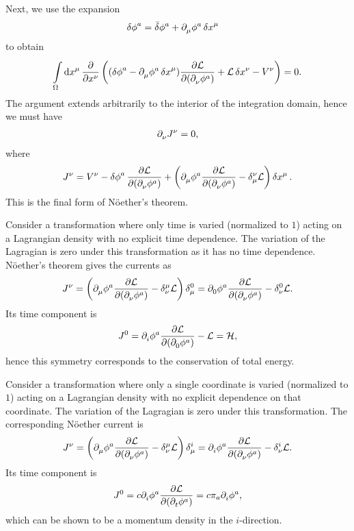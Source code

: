 Next, we use the expansion
\begin{align*}
	\var{\phi}^{a}  &= \bar{\delta}\phi^{a} + \partial^{}_{\mu}{\phi^{a}}\var{x}^{\mu}
\end{align*}
to obtain
\begin{align*}
	\int\limits_{\Omega}^{}\dd{x^{\mu}}{\pdv{x^{\nu}}\left((\var{\phi}^{a} - \ensuremath{\partial^{}_{\mu}}{\phi^{a}}\var{x}^{\mu})\pdv{\ensuremath{\mathcal{L}}}{(\ensuremath{\partial^{}_{\nu}}{\phi^{a}})} + \ensuremath{\mathcal{L}}\var{x^{\nu}} - V^{\nu}\right)} = 0.
\end{align*}
The argument extends arbitrarily to the interior of the integration domain, hence we must have
\begin{align*}
	\partial^{}_{\nu}{J^{\nu}} = 0,
\end{align*}
where
\begin{align*}
	J^{\nu} = V^{\nu} - \var{\phi}^{a}\pdv{\lag}{(\del{}{\nu}{\phi^{a}})} + \left(\del{}{\mu}{\phi^{a}}\pdv{\lag}{(\del{}{\nu}{\phi^{a}})} - \kdelta{\nu}{\mu}\lag\right)\var{x^{\mu}}.
\end{align*}
This is the final form of Nöether's theorem.

Consider a transformation where only time is varied (normalized to $1$) acting on a Lagrangian density with no explicit time dependence. The variation of the Lagragian is zero under this transformation as it has no time dependence. Nöether's theorem gives the currents as
\begin{align*}
	J^{\nu} = \left(\del{}{\mu}{\phi^{a}}\pdv{\lag}{(\del{}{\nu}{\phi^{a}})} - \kdelta{\mu}{\nu}\lag\right)\kdelta{0}{\mu} = \del{}{0}{\phi^{a}}\pdv{\lag}{(\del{}{\nu}{\phi^{a}})} - \kdelta{0}{\nu}\lag.
\end{align*}
Its time component is
\begin{align*}
	J^{0} = \partial^{}_{i}{\phi^{a}}\pdv{\ensuremath{\mathcal{L}}}{(\ensuremath{\partial^{}_{0}}{\phi^{a}})} - \mathcal{L} = \mathcal{H},
\end{align*}
hence this symmetry corresponds to the conservation of total energy.

Consider a transformation where only a single coordinate is varied (normalized to $1$) acting on a Lagrangian density with no explicit dependence on that coordinate. The variation of the Lagragian is zero under this transformation. The corresponding Nöether current is
\begin{align*}
	J^{\nu} = \left(\del{}{\mu}{\phi^{a}}\pdv{\lag}{(\del{}{\nu}{\phi^{a}})} - \kdelta{\mu}{\nu}\lag\right)\kdelta{i}{\mu} = \del{}{i}{\phi^{a}}\pdv{\lag}{(\del{}{\nu}{\phi^{a}})} - \kdelta{i}{\nu}\lag.
\end{align*}
Its time component is
\begin{align*}
	J^{0} = c\partial^{}_{i}{\phi^{a}}\pdv{\ensuremath{\mathcal{L}}}{(\ensuremath{\partial^{}_{t}}{\phi^{a}})} = c\pi_{a}\partial^{}_{i}{\phi^{a}},
\end{align*}
which can be shown to be a momentum density in the $i$-direction.

